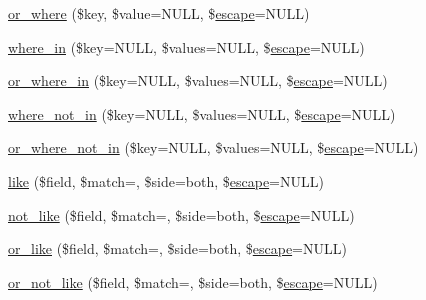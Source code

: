 \begin{DoxyCompactItemize}
\item 
\mbox{\hyperlink{class_c_i___d_b__query__builder_a8d25e93a09f60fbe77541d0faef29bf0}{or\+\_\+where}} (\$key, \$value=N\+U\+LL, \$\mbox{\hyperlink{class_c_i___d_b__driver_ac8f37ca5703d4558c732e692194f8cd6}{escape}}=N\+U\+LL)
\item 
\mbox{\hyperlink{class_c_i___d_b__query__builder_ad74b2c2b21b33f4aa54229a323b7ba59}{where\+\_\+in}} (\$key=N\+U\+LL, \$values=N\+U\+LL, \$\mbox{\hyperlink{class_c_i___d_b__driver_ac8f37ca5703d4558c732e692194f8cd6}{escape}}=N\+U\+LL)
\item 
\mbox{\hyperlink{class_c_i___d_b__query__builder_a9c3f8f4d2f9b9b033a27a2d868278662}{or\+\_\+where\+\_\+in}} (\$key=N\+U\+LL, \$values=N\+U\+LL, \$\mbox{\hyperlink{class_c_i___d_b__driver_ac8f37ca5703d4558c732e692194f8cd6}{escape}}=N\+U\+LL)
\item 
\mbox{\hyperlink{class_c_i___d_b__query__builder_ab9f1b5e0622e0392796c5c9f4cca705a}{where\+\_\+not\+\_\+in}} (\$key=N\+U\+LL, \$values=N\+U\+LL, \$\mbox{\hyperlink{class_c_i___d_b__driver_ac8f37ca5703d4558c732e692194f8cd6}{escape}}=N\+U\+LL)
\item 
\mbox{\hyperlink{class_c_i___d_b__query__builder_ace5f568aace8a66636091e220fcd03c3}{or\+\_\+where\+\_\+not\+\_\+in}} (\$key=N\+U\+LL, \$values=N\+U\+LL, \$\mbox{\hyperlink{class_c_i___d_b__driver_ac8f37ca5703d4558c732e692194f8cd6}{escape}}=N\+U\+LL)
\item 
\mbox{\hyperlink{class_c_i___d_b__query__builder_ada4c73fd6f292084d8b84b0db958fcc1}{like}} (\$field, \$match=\textquotesingle{}\textquotesingle{}, \$side=\textquotesingle{}both\textquotesingle{}, \$\mbox{\hyperlink{class_c_i___d_b__driver_ac8f37ca5703d4558c732e692194f8cd6}{escape}}=N\+U\+LL)
\item 
\mbox{\hyperlink{class_c_i___d_b__query__builder_ac87c3421e7d396a714740b1a9c0fe8ea}{not\+\_\+like}} (\$field, \$match=\textquotesingle{}\textquotesingle{}, \$side=\textquotesingle{}both\textquotesingle{}, \$\mbox{\hyperlink{class_c_i___d_b__driver_ac8f37ca5703d4558c732e692194f8cd6}{escape}}=N\+U\+LL)
\item 
\mbox{\hyperlink{class_c_i___d_b__query__builder_aef08c014f8925124292fa6a65c014d25}{or\+\_\+like}} (\$field, \$match=\textquotesingle{}\textquotesingle{}, \$side=\textquotesingle{}both\textquotesingle{}, \$\mbox{\hyperlink{class_c_i___d_b__driver_ac8f37ca5703d4558c732e692194f8cd6}{escape}}=N\+U\+LL)
\item 
\mbox{\hyperlink{class_c_i___d_b__query__builder_a37af2f8d33a06c1cc2ad9dafc2c88e90}{or\+\_\+not\+\_\+like}} (\$field, \$match=\textquotesingle{}\textquotesingle{}, \$side=\textquotesingle{}both\textquotesingle{}, \$\mbox{\hyperlink{class_c_i___d_b__driver_ac8f37ca5703d4558c732e692194f8cd6}{escape}}=N\+U\+LL)

\end{DoxyCompactItemize}
